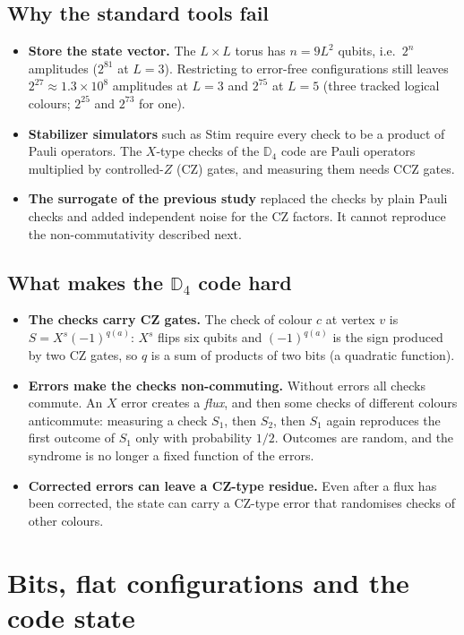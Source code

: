 \documentclass[11pt,a4paper]{article}
\begin{document}
\subsection{Why the standard tools fail}
\begin{itemize}
\item \textbf{Store the state vector.} The $L\times L$ torus has $n=9L^2$ qubits, i.e.\ $2^n$ amplitudes ($2^{81}$ at $L=3$). Restricting to error-free configurations still leaves $2^{27}\approx1.3\times10^8$ amplitudes at $L=3$ and $2^{75}$ at $L=5$ (three tracked logical colours; $2^{25}$ and $2^{73}$ for one).
\item \textbf{Stabilizer simulators} such as Stim require every check to be a product of Pauli operators. The $X$-type checks of the $\mathbb{D}_4$ code are Pauli operators multiplied by controlled-$Z$ (CZ) gates, and measuring them needs CCZ gates.
\item \textbf{The surrogate of the previous study} replaced the checks by plain Pauli checks and added independent noise for the CZ factors. It cannot reproduce the non-commutativity described next.
\end{itemize}

\subsection{What makes the \texorpdfstring{$\mathbb{D}_4$}{D4} code hard}
\begin{itemize}
\item \textbf{The checks carry CZ gates.} The check of colour $c$ at vertex $v$ is $S=X^{s}(-1)^{q(a)}$: $X^{s}$ flips six qubits and $(-1)^{q(a)}$ is the sign produced by two CZ gates, so $q$ is a sum of products of two bits (a quadratic function).
\item \textbf{Errors make the checks non-commuting.} Without errors all checks commute. An $X$ error creates a \emph{flux}, and then some checks of different colours anticommute: measuring a check $S_1$, then $S_2$, then $S_1$ again reproduces the first outcome of $S_1$ only with probability $1/2$. Outcomes are random, and the syndrome is no longer a fixed function of the errors.
\item \textbf{Corrected errors can leave a CZ-type residue.} Even after a flux has been corrected, the state can carry a CZ-type error that randomises checks of other colours.
\end{itemize}

\section{Bits, flat configurations and the code state}
\end{document}
